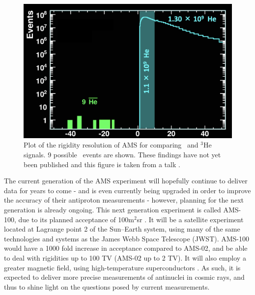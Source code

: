 \begin{figure}
    \centering
    \includegraphics[width=\textwidth]{figures/AMS_he3bar_events_MIAPP.png}
    \caption{Plot of the rigidity resolution of AMS for comparing \ahe\ and $^3\mathrm{He}$ signals. 9 possible \ahe\ events are shown. These findings have not yet been published and this figure is taken from a talk \cite{}.}
    \label{fig:AMS_MIAPP_talk_ahe}
\end{figure}

The current generation of the AMS experiment will hopefully continue to deliver data for years to come - and is even currently being upgraded in order to improve the accuracy of their antiproton measurements - however, planning for the next generation is already ongoing. This next generation experiment is called AMS-100, due to its planned acceptance of 100m$^2$sr \cite{}. It will be a satellite experiment located at Lagrange point 2 of the Sun--Earth system, using many of the same technologies and systems as the James Webb Space Telescope (JWST). AMS-100 would have a 1000 fold increase in acceptance compared to AMS-02, and be able to deal with rigidities up to 100 TV (AMS-02 up to 2 TV). It will also employ a greater magnetic field, using high-temperature superconductors \cite{}. As such, it is expected to deliver more precise measurements of antinuclei in cosmic rays, and thus to shine light on the questions posed by current measurements.\\

